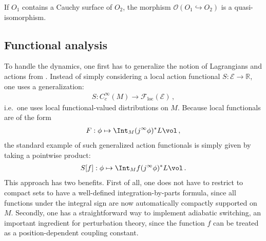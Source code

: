     \begin{axiom}
        If $O_1$ contains a Cauchy surface of $O_2$, the morphism $\mathcal{O}(O_1\hookrightarrow O_2)$ is a quasi-isomorphism.
    \end{axiom}


\subsection{Functional analysis}

    To handle the dynamics, one first has to generalize the notion of Lagrangians and actions from . Instead of simply considering a local action functional $S:\mathcal{E}\rightarrow\mathbb{R}$, one uses a generalization:
    \begin{gather}
        S:C^\infty_c(M)\rightarrow\mathcal{F}_{\text{loc}}(\mathcal{E})\,,
    \end{gather}
    i.e.~one uses local functional-valued distributions on $M$. Because local functionals are of the form
    \begin{gather}
        F:\phi\mapsto\Int_M (j^\infty\phi)^*L\vol\,,
    \end{gather}
    the standard example of such generalized action functionals is simply given by taking a pointwise product:
    \begin{gather}
        S[f]:\phi\mapsto\Int_Mf(j^\infty\phi)^*L\vol\,.
    \end{gather}
    This approach has two benefits. First of all, one does not have to restrict to compact sets to have a well-defined integration-by-parts formula, since all functions under the integral sign are now automatically compactly supported on $M$. Secondly, one has a straightforward way to implement adiabatic switching, an important ingredient for perturbation theory, since the function $f$ can be treated as a position-dependent coupling constant.

